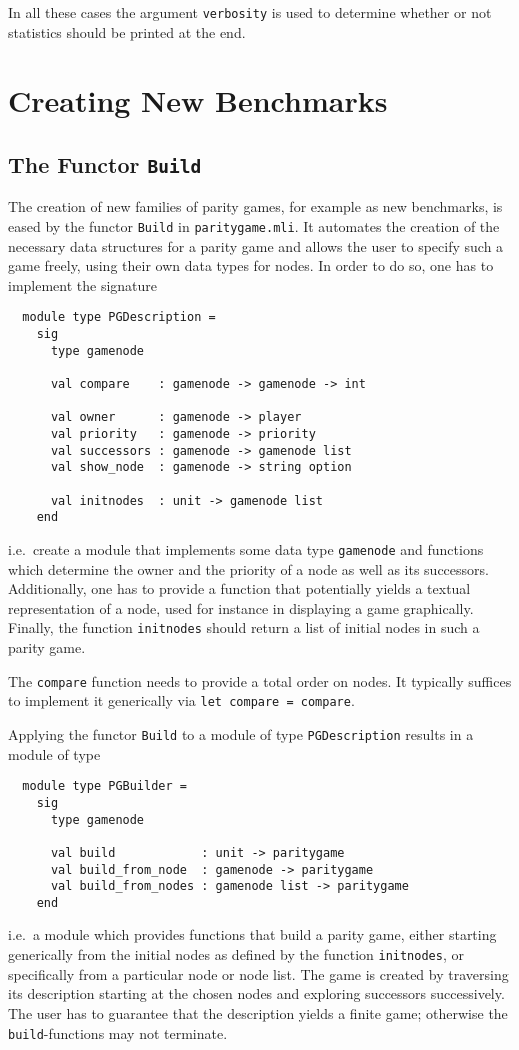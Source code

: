 In all these cases the argument \verb+verbosity+ is used to determine whether or not statistics should be printed
at the end.

\section{Creating New Benchmarks}

\subsection{The Functor \texttt{Build}}
The creation of new families of parity games, for example as new benchmarks, is eased by the functor \texttt{Build} in
\texttt{paritygame.mli}. It automates the creation of the necessary data structures for a parity game and allows the
user to specify such a game freely, using their own data types for nodes. In order to do so, one has to implement the
signature
\begin{verbatim}
  module type PGDescription =
    sig
      type gamenode

      val compare    : gamenode -> gamenode -> int

      val owner      : gamenode -> player
      val priority   : gamenode -> priority
      val successors : gamenode -> gamenode list 
      val show_node  : gamenode -> string option

      val initnodes  : unit -> gamenode list 
    end
\end{verbatim}
i.e.\ create a module that implements some data type \verb#gamenode# and functions which determine the owner and the
priority of a node as well as its successors. Additionally, one has to provide a function that potentially yields a
textual representation of a node, used for instance in displaying a game graphically. Finally, the function \verb#initnodes#
should return a list of initial nodes in such a parity game. 

The \verb#compare# function needs to provide a total order on nodes. It typically suffices to implement it generically via
\verb#let compare = compare#.

Applying the functor \verb#Build# to a module of type \verb#PGDescription# results in a module of type
\begin{verbatim}
  module type PGBuilder = 
    sig
      type gamenode
	     
      val build            : unit -> paritygame
      val build_from_node  : gamenode -> paritygame
      val build_from_nodes : gamenode list -> paritygame
    end
\end{verbatim}
i.e.\ a module which provides functions that build a parity game, either starting generically from the initial nodes as 
defined by the function \verb#initnodes#, or specifically from a particular node or node list. The game is created by 
traversing its description starting at the chosen nodes and exploring successors successively. The user has to guarantee
that the description yields a finite game; otherwise the \verb#build#-functions may not terminate.

